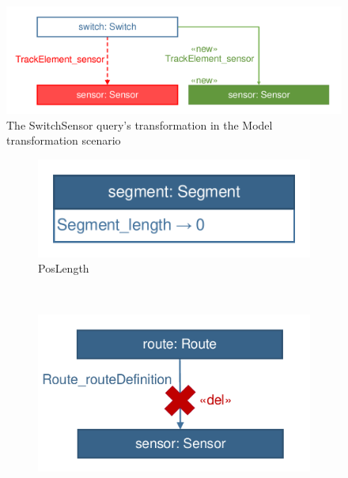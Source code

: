 \begin{figure}[!Htb]
	\centering
	\includegraphics[scale=0.4]{figures/trainbenchmark-transformation-xform-switchsensor}
	\caption{The \textsf{SwitchSensor} query's transformation in the Model transformation scenario}
	\label{fig:trainbenchmark-transformation-xform-switchsensor}
\end{figure}


\begin{figure}
        \centering
        \begin{subfigure}[b]{0.25\textwidth}
                \includegraphics[width=\textwidth]{figures/trainbenchmark-transformation-user-poslength}
                \caption{\textsf{PosLength}}
                \label{fig:trainbenchmark-transformation-user-poslength}
        \end{subfigure}
        ~
        \begin{subfigure}[b]{0.3\textwidth}
                \includegraphics[width=\textwidth]{figures/trainbenchmark-transformation-user-routesensor}

\end{subfigure}
\end{figure}
